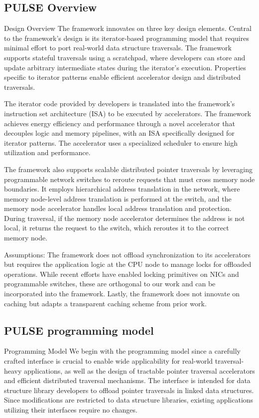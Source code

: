\subsection{PULSE Overview}

Design Overview
The framework innovates on three key design elements. Central to the framework’s design is its iterator-based programming model that requires minimal effort to port real-world data structure traversals. The framework supports stateful traversals using a scratchpad, where developers can store and update arbitrary intermediate states during the iterator's execution. Properties specific to iterator patterns enable efficient accelerator design and distributed traversals.

The iterator code provided by developers is translated into the framework’s instruction set architecture (ISA) to be executed by accelerators. The framework achieves energy efficiency and performance through a novel accelerator that decouples logic and memory pipelines, with an ISA specifically designed for iterator patterns. The accelerator uses a specialized scheduler to ensure high utilization and performance.

The framework also supports scalable distributed pointer traversals by leveraging programmable network switches to reroute requests that must cross memory node boundaries. It employs hierarchical address translation in the network, where memory node-level address translation is performed at the switch, and the memory node accelerator handles local address translation and protection. During traversal, if the memory node accelerator determines the address is not local, it returns the request to the switch, which reroutes it to the correct memory node.

Assumptions: The framework does not offload synchronization to its accelerators but requires the application logic at the CPU node to manage locks for offloaded operations. While recent efforts have enabled locking primitives on NICs and programmable switches, these are orthogonal to our work and can be incorporated into the framework. Lastly, the framework does not innovate on caching but adapts a transparent caching scheme from prior work.

\subsection{PULSE programming model}
Programming Model
We begin with the programming model since a carefully crafted interface is crucial to enable wide applicability for real-world traversal-heavy applications, as well as the design of tractable pointer traversal accelerators and efficient distributed traversal mechanisms. The interface is intended for data structure library developers to offload pointer traversals in linked data structures. Since modifications are restricted to data structure libraries, existing applications utilizing their interfaces require no changes.

